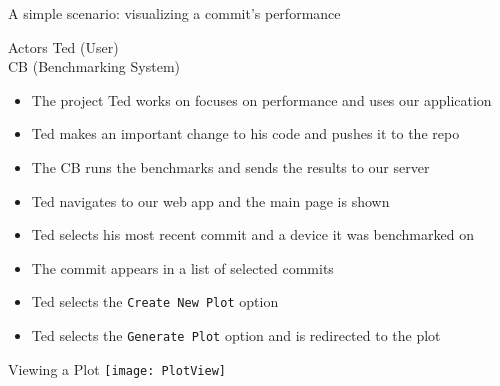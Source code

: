 \begin{frame}{A simple scenario: visualizing a commit's performance}
  \begin{block}{Actors}
    Ted (User)\\
    CB (Benchmarking System)
  \end{block}
  \begin{itemize}
    \item The project Ted works on focuses on performance and uses our application
    \item Ted makes an important change to his code and pushes it to the repo
    \item The CB runs the benchmarks and sends the results to our server
    \item Ted navigates to our web app and the main page is shown
    \item Ted selects his most recent commit and a device it was benchmarked on
    \item The commit appears in a list of selected commits
    \item Ted selects the \texttt{Create New Plot} option
    \item Ted selects the \texttt{Generate Plot} option and is redirected to the plot
  \end{itemize}
\end{frame}

\begin{frame}{Viewing a Plot}
  \texttt{[image: PlotView]}
\end{frame}
